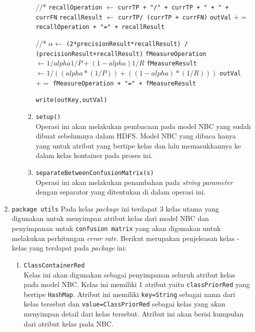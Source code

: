 \begin{enumerate}
\begin{itemize}
\begin{enumerate}
\begin{algorithm}[H]
\begin{algorithmic}[1]
				//*
				\State \texttt{recallOperation} $\gets$ \texttt{currTP + "/" + currTP + " + " + currFN}
				\State \texttt{recallResult} $\gets$ \texttt{currTP/ (currTP + currFN)}
				\State \texttt{outVal} $+=$ \texttt{recallOperation + "=" + recallResult}
				
				//*
				\State $\alpha \gets$ \texttt{(2*precisionResult*recallResult) / (precisionResult+recallResult)}
				\State \texttt{fMeasureOperation} $\gets 1 / {alpha{1 / P}+(1-alpha) 1/R}$
				\State \texttt{fMeasureResult} $\gets 1/((alpha * (1/P)) + ((1 - alpha) * (1/R)))$
				\State \texttt{outVal} $+=$ \texttt{fMeasureOperation + "=" + fMeasureResult}
				
				
			\EndFor
			
			\State \texttt{write(outKey,outVal)}
				
			\EndProcedure
			\end{algorithmic}
			\end{algorithm}
			
			\item{\texttt{setup()}}\\
			Operasi ini akan melakukan pembacaan pada model NBC yang sudah dibuat sebelumnya dalam HDFS. Model NBC yang dibaca hanya yang untuk atribut yang bertipe kelas dan lalu memasukkannya ke dalam kelas kontainer pada proses ini.
			
			
			\item{\texttt{separateBetweenConfusionMatrix(s)}}\\
			Operasi ini akan melakukan penambahan pada \textit{string parameter} dengan separator yang ditentukan di dalam operasi ini.
			
		\end{enumerate}
	
		
		
		
	\end{itemize}
	
	\item \texttt{package utils}
	Pada kelas \textit{package} ini	terdapat 3 kelas utama yang digunakan untuk menyimpan atribut kelas dari model NBC dan penyimpanan untuk \texttt{confusion matrix} yang akan digunakan untuk melakukan perhitungan \textit{error rate}. Berikut merupakan penjeleasan kelas - kelas yang terdapat pada \textit{package} ini:
	\begin{enumerate}
		\item \texttt{ClassContainerRed}\\
		Kelas ini akan digunakan sebagai penyimpanan seluruh atribut kelas pada model NBC. Kelas ini memiliki 1 atribut yaitu \texttt{classPriorRed} yang bertipe \texttt{HashMap}. Atribut ini memiliki \texttt{key=String} sebagai nama dari kelas tersebut dan \texttt{value=ClassPriorRed} sebagai kelas yang akan menyimpan detail dari kelas tersebut. Atribut ini akan berisi kumpulan dari atribut kelas pada NBC.
		

\end{enumerate}
\end{enumerate}
